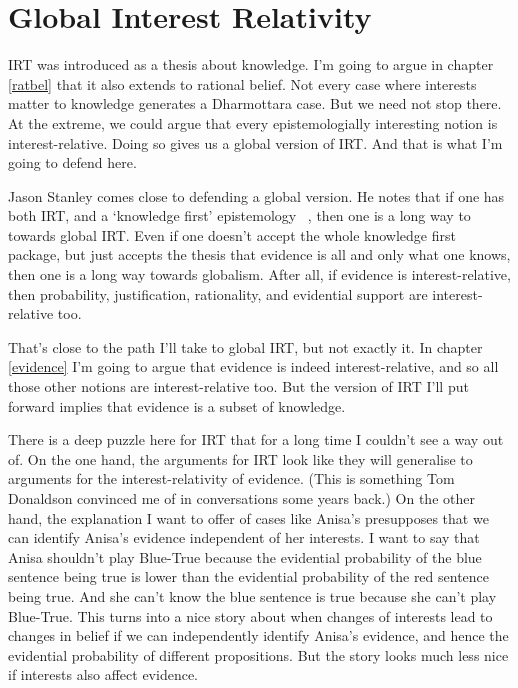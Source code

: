 \documentclass[
  11pt,
]{book}
\begin{document}
\hypertarget{global}{%
\section{Global Interest Relativity}\label{global}}

IRT was introduced as a thesis about knowledge. I'm going to argue in chapter \ref{ratbel} that it also extends to rational belief. Not every case where interests matter to knowledge generates a Dharmottara case. But we need not stop there. At the extreme, we could argue that every epistemologially interesting notion is interest-relative. Doing so gives us a global version of IRT. And that is what I'm going to defend here.

Jason Stanley \citeyearpar{Stanley2005} comes close to defending a global version. He notes that if one has both IRT, and a `knowledge first' epistemology ~\citep{Williamson2000}, then one is a long way to towards global IRT. Even if one doesn't accept the whole knowledge first package, but just accepts the thesis that evidence is all and only what one knows, then one is a long way towards globalism. After all, if evidence is interest-relative, then probability, justification, rationality, and evidential support are interest-relative too.

That's close to the path I'll take to global IRT, but not exactly it. In chapter \ref{evidence} I'm going to argue that evidence is indeed interest-relative, and so all those other notions are interest-relative too. But the version of IRT I'll put forward implies that evidence is a subset of knowledge.

There is a deep puzzle here for IRT that for a long time I couldn't see a way out of. On the one hand, the arguments for IRT look like they will generalise to arguments for the interest-relativity of evidence. (This is something Tom Donaldson convinced me of in conversations some years back.) On the other hand, the explanation I want to offer of cases like Anisa's presupposes that we can identify Anisa's evidence independent of her interests. I want to say that Anisa shouldn't play Blue-True because the evidential probability of the blue sentence being true is lower than the evidential probability of the red sentence being true. And she can't know the blue sentence is true because she can't play Blue-True. This turns into a nice story about when changes of interests lead to changes in belief if we can independently identify Anisa's evidence, and hence the evidential probability of different propositions. But the story looks much less nice if interests also affect evidence.
\end{document}
